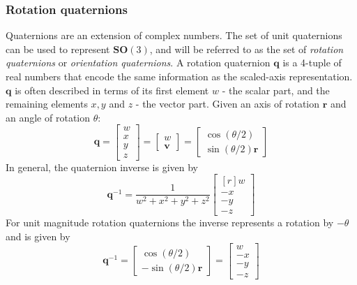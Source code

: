 		\subsubsection{Rotation quaternions}
		Quaternions are an extension of complex numbers. The set of unit quaternions can be used to represent $\mathbf{SO}(3)$, and will be referred to as the set of \textit{rotation quaternions} or \textit{orientation quaternions}. 
		A rotation quaternion $\mathbf{q}$ is a 4-tuple of real numbers that encode the same information as the scaled-axis representation. $\mathbf{q}$ is often described in terms of its first element $w$ - the scalar part, and the remaining elements $x,y$ and $z$ - the vector part. Given an axis of rotation $\mathbf{r}$ and an angle of rotation $\theta$:
		\begin{equation}
			\mathbf{q} = 
			\begin{bmatrix}
				w \\
				x \\
				y \\
				z
			\end{bmatrix}
			 = 
			 \begin{bmatrix}
 				w \\
 				\mathbf{v}
			 \end{bmatrix}
			 =
			 \begin{bmatrix}
			 	\cos(\theta/2) \\
			 	\sin(\theta/2)\mathbf{r}
			 \end{bmatrix}
		\end{equation}
		In general, the quaternion inverse is given by
		\begin{equation}
			\mathbf{q}^{-1} = 
			\frac{1}{w^2 + x^2 + y^2 + z^2}
		 	\begin{bmatrix*}[r]
				 w \\
				-x \\
				-y \\
				-z
			\end{bmatrix*}
		\end{equation}
		For unit magnitude rotation quaternions the inverse represents a rotation by $-\theta$ and is given by
		\begin{equation}
			\mathbf{q}^{-1} = 
			\begin{bmatrix}
			 	\cos(\theta/2) \\
			 	-\sin(\theta/2)\mathbf{r}
		 	\end{bmatrix} =
		 	\begin{bmatrix}
				w \\
				-x \\
				-y \\
				-z
			\end{bmatrix}
		\end{equation}
		
